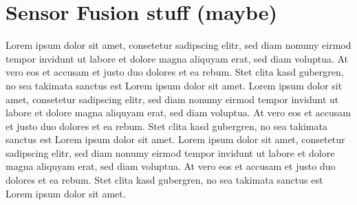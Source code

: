\section{Sensor Fusion stuff (maybe)}
Lorem ipsum dolor sit amet, consetetur sadipscing elitr, sed diam nonumy eirmod tempor invidunt ut labore et dolore magna aliquyam erat, sed diam voluptua. At vero eos et accusam et justo duo dolores et ea rebum. Stet clita kasd gubergren, no sea takimata sanctus est Lorem ipsum dolor sit amet. Lorem ipsum dolor sit amet, consetetur sadipscing elitr, sed diam nonumy eirmod tempor invidunt ut labore et dolore magna aliquyam erat, sed diam voluptua. At vero eos et accusam et justo duo dolores et ea rebum. Stet clita kasd gubergren, no sea takimata sanctus est Lorem ipsum dolor sit amet. Lorem ipsum dolor sit amet, consetetur sadipscing elitr, sed diam nonumy eirmod tempor invidunt ut labore et dolore magna aliquyam erat, sed diam voluptua. At vero eos et accusam et justo duo dolores et ea rebum. Stet clita kasd gubergren, no sea takimata sanctus est Lorem ipsum dolor sit amet.